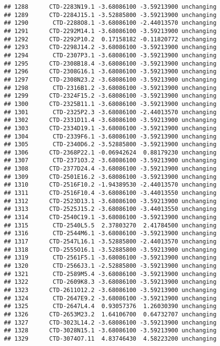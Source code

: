 \documentclass[]{article}
\begin{document}
\begin{verbatim}
## 1288      CTD-2283N19.1 -3.68086100 -3.59213900 unchanging
## 1289      CTD-2284J15.1 -3.52885800 -3.59213900 unchanging
## 1290       CTD-2288O8.1 -3.68086100 -2.44013570 unchanging
## 1291      CTD-2292M14.1 -3.68086100 -3.59213900 unchanging
## 1292      CTD-2292P10.2  0.17158182 -0.11820772 unchanging
## 1293      CTD-2298J14.2 -3.68086100 -3.59213900 unchanging
## 1294       CTD-2307P3.1 -3.68086100 -3.59213900 unchanging
## 1295      CTD-2308B18.4 -3.68086100 -3.59213900 unchanging
## 1296      CTD-2308G16.1 -3.68086100 -3.59213900 unchanging
## 1297      CTD-2308N23.2 -3.68086100 -3.59213900 unchanging
## 1298       CTD-2316B1.2 -3.68086100 -3.59213900 unchanging
## 1299      CTD-2324F15.2 -3.68086100 -3.59213900 unchanging
## 1300      CTD-2325B11.1 -3.68086100 -3.59213900 unchanging
## 1301       CTD-2325P2.3 -3.68086100 -2.44013570 unchanging
## 1302      CTD-2331D11.4 -3.68086100 -3.59213900 unchanging
## 1303      CTD-2334D19.1 -3.68086100 -3.59213900 unchanging
## 1304       CTD-2339F6.1 -3.68086100 -3.59213900 unchanging
## 1305       CTD-2340D6.2 -3.52885800 -3.59213900 unchanging
## 1306      CTD-2368P22.1 -0.06942624  0.88179230 unchanging
## 1307       CTD-2371O3.2 -3.68086100 -3.59213900 unchanging
## 1308      CTD-2377D24.4 -3.68086100 -3.59213900 unchanging
## 1309      CTD-2501E16.2 -3.68086100 -3.59213900 unchanging
## 1310      CTD-2516F10.2 -1.94389530 -2.44013570 unchanging
## 1311      CTD-2516F10.4 -3.68086100 -3.44013550 unchanging
## 1312      CTD-2523D13.1 -3.68086100 -3.59213900 unchanging
## 1313      CTD-2525J15.2 -3.68086100 -3.44013550 unchanging
## 1314      CTD-2540C19.1 -3.68086100 -3.59213900 unchanging
## 1315       CTD-2540L5.5  2.37803270  2.41784500 unchanging
## 1316       CTD-2544M6.1 -3.68086100 -3.59213900 unchanging
## 1317      CTD-2547L16.1 -3.52885800 -2.44013570 unchanging
## 1318      CTD-2555O16.1 -3.52885800 -3.59213900 unchanging
## 1319       CTD-2561F5.1 -3.68086100 -3.59213900 unchanging
## 1320       CTD-2566J3.1 -2.52885800 -3.59213900 unchanging
## 1321       CTD-2589M5.4 -3.68086100 -3.59213900 unchanging
## 1322       CTD-2609K8.3 -3.68086100 -3.59213900 unchanging
## 1323      CTD-2611O12.2 -3.68086100 -3.59213900 unchanging
## 1324       CTD-2647E9.2 -3.68086100 -3.59213900 unchanging
## 1325       CTD-2647L4.4  0.93057376  1.26030390 unchanging
## 1326      CTD-2653M23.2  1.64106700  0.64732707 unchanging
## 1327      CTD-3023L14.2 -3.68086100 -3.59213900 unchanging
## 1328      CTD-3028N15.1 -3.68086100 -3.59213900 unchanging
## 1329      CTD-3074O7.11  4.83746430  4.58223200 unchanging

\end{verbatim}
\end{document}
